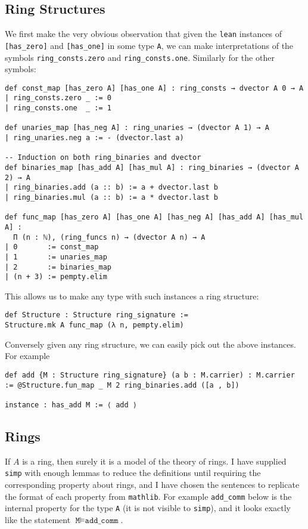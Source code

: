 \subsection{Ring Structures}

We first make the very obvious observation that given
the \texttt{lean} instances of \texttt{[has\_zero]} and \texttt{[has\_one]}
in some type \texttt{A},
we can make interpretations of the symbols \texttt{ring\_consts.zero}
and \texttt{ring\_consts.one}.
Similarly for the other symbols:

\begin{lstlisting}
def const_map [has_zero A] [has_one A] : ring_consts → dvector A 0 → A
| ring_consts.zero _ := 0
| ring_consts.one  _ := 1

def unaries_map [has_neg A] : ring_unaries → (dvector A 1) → A
| ring_unaries.neg a := - (dvector.last a)

-- Induction on both ring_binaries and dvector
def binaries_map [has_add A] [has_mul A] : ring_binaries → (dvector A 2) → A
| ring_binaries.add (a :: b) := a + dvector.last b
| ring_binaries.mul (a :: b) := a * dvector.last b

def func_map [has_zero A] [has_one A] [has_neg A] [has_add A] [has_mul A] :
  Π (n : ℕ), (ring_funcs n) → (dvector A n) → A
| 0       := const_map
| 1       := unaries_map
| 2       := binaries_map
| (n + 3) := pempty.elim\end{lstlisting}

This allows us to make any type with such instances a ring structure:

\begin{lstlisting}
def Structure : Structure ring_signature :=
Structure.mk A func_map (λ n, pempty.elim)\end{lstlisting}

Conversely given any ring structure,
we can easily pick out the above instances.
For example
\begin{lstlisting}
def add {M : Structure ring_signature} (a b : M.carrier) : M.carrier := @Structure.fun_map _ M 2 ring_binaries.add ([a , b])

instance : has_add M := ⟨ add ⟩\end{lstlisting}

\subsection{Rings}
If $A$ is a ring, then surely it is a model of the theory of rings.
I have supplied \texttt{simp} with enough lemmas to reduce the definitions
until requiring the corresponding property about rings,
and I have chosen the sentences to replicate the format of
each property from \texttt{mathlib}.
For example \texttt{add\_comm} below
is the internal property for the type \texttt{A}
(it is not visible to \texttt{simp}),
and it looks exactly like the statement $\texttt{M} \vDash \texttt{add\_comm}$.

